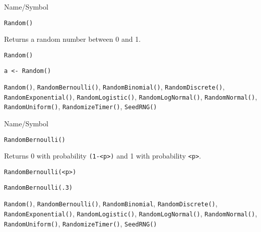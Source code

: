 \begin{desc}{Name/Symbol}
\item[Name/Symbol]	\verb+Random()+

\item[Description]	Returns a random number between 0 and 1.

\item[Usage]
\begin{verbatim}
Random()
\end{verbatim}

\item[Example]
\begin{verbatim}
a <- Random()
\end{verbatim}

\item[See Also]		\verb+Random()+, \verb+RandomBernoulli()+, \verb+RandomBinomial()+, \verb+RandomDiscrete()+, \verb+RandomExponential()+, \verb+RandomLogistic()+, \verb+RandomLogNormal()+, \verb+RandomNormal()+, \verb+RandomUniform()+, \verb+RandomizeTimer()+, \verb+SeedRNG()+
\end{desc}

\rl


\begin{desc}{Name/Symbol}
\item[Name/Symbol]	\verb+RandomBernoulli()+

\item[Description]	Returns 0 with probability \verb+(1-<p>)+ and 1 with probability \verb+<p>+.

\item[Usage]		
\begin{verbatim}
RandomBernoulli(<p>)
\end{verbatim}

\item[Example]	
\begin{verbatim}
RandomBernoulli(.3)
\end{verbatim}

\item[See Also] \verb+Random()+, \verb+RandomBernoulli()+,
  \verb+RandomBinomial+, \verb+RandomDiscrete()+,
  \verb+RandomExponential()+, \verb+RandomLogistic()+,
  \verb+RandomLogNormal()+, \verb+RandomNormal()+,
  \verb+RandomUniform()+, \verb+RandomizeTimer()+, \verb+SeedRNG()+
\end{desc}

\rl


